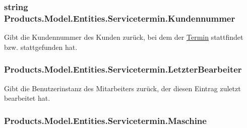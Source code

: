 \subsubsection[{\texorpdfstring{Kundennummer}{Kundennummer}}]{\setlength{\rightskip}{0pt plus 5cm}string Products.\+Model.\+Entities.\+Servicetermin.\+Kundennummer\hspace{0.3cm}{\ttfamily [get]}}\hypertarget{class_products_1_1_model_1_1_entities_1_1_servicetermin_a99efd99366ef68cd9e205080fc022213}{}\label{class_products_1_1_model_1_1_entities_1_1_servicetermin_a99efd99366ef68cd9e205080fc022213}


Gibt die Kundennummer des Kunden zurück, bei dem der \hyperlink{class_products_1_1_model_1_1_entities_1_1_termin}{Termin} stattfindet bzw. stattgefunden hat. 

\subsubsection[{\texorpdfstring{Letzter\+Bearbeiter}{LetzterBearbeiter}}]{ Products.\+Model.\+Entities.\+Servicetermin.\+Letzter\+Bearbeiter\hspace{0.3cm}{\ttfamily [get]}}\hypertarget{class_products_1_1_model_1_1_entities_1_1_servicetermin_a7b21dd1028d933e09d420ed0e742c5c4}{}\label{class_products_1_1_model_1_1_entities_1_1_servicetermin_a7b21dd1028d933e09d420ed0e742c5c4}


Gibt die Benutzerinstanz des Mitarbeiters zurück, der diesen Eintrag zuletzt bearbeitet hat. 

\subsubsection[{\texorpdfstring{Maschine}{Maschine}}]{ Products.\+Model.\+Entities.\+Servicetermin.\+Maschine\hspace{0.3cm}{\ttfamily [get]}}\hypertarget{class_products_1_1_model_1_1_entities_1_1_servicetermin_a7354eef6703d90e47f67faf1456c0022}{}\label{class_products_1_1_model_1_1_entities_1_1_servicetermin_a7354eef6703d90e47f67faf1456c0022}


